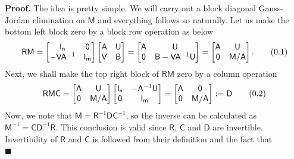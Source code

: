 \documentclass[10pt]{article}
\theoremstyle{definition}
\newenvironment{prf}{\noindent\textbf{Proof.}}{\hfill$\blacksquare$}
\newcommand\eqnum{\addtocounter{equation}{1}\tag{\arabic{section}.\arabic{equation}}}
\begin{document}
\begin{prf}
The idea is pretty simple. We will carry out a block diagonal Gauss-Jordan elimination on $\mathsf{M}$ and everything follows so naturally. Let us make the bottom left block zero by a block row operation as below
\begin{equation*}
\mathsf{R}\mathsf{M} =
\begin{bmatrix}
\mathsf{I_n} & \mathsf{0} \\
-\mathsf{V}\mathsf{A}^{-1} & \mathsf{I_m}
\end{bmatrix}
\begin{bmatrix}
\mathsf{A} & \mathsf{U} \\
\mathsf{V} & \mathsf{B}
\end{bmatrix} =
\begin{bmatrix}
\mathsf{A} & \mathsf{U} \\
\mathsf{0} & \mathsf{B}-\mathsf{V}\mathsf{A}^{-1}\mathsf{U}
\end{bmatrix} =
\begin{bmatrix}
\mathsf{A} & \mathsf{U} \\
\mathsf{0} & \mathsf{M}/\mathsf{A}
\end{bmatrix}.
\eqnum
\label{eq:inv:RM}
\end{equation*}
Next, we shall make the top right block of $\mathsf{R}\mathsf{M}$ zero by a column operation
\begin{equation*}
\mathsf{R}\mathsf{M}\mathsf{C} =
\begin{bmatrix}
\mathsf{A} & \mathsf{U} \\
\mathsf{0} & \mathsf{M}/\mathsf{A}
\end{bmatrix}
\begin{bmatrix}
\mathsf{I_n} & -\mathsf{A}^{-1}\mathsf{U} \\
\mathsf{0} & \mathsf{I_m}
\end{bmatrix} = 
\begin{bmatrix}
\mathsf{A} & \mathsf{0} \\
\mathsf{0} & \mathsf{M}/\mathsf{A}
\end{bmatrix} := \mathsf{D}
\eqnum
\label{eq:D:RMC}
\end{equation*}
Now, we note that $\mathsf{M} = \mathsf{R}^{-1}\mathsf{D}\mathsf{C}^{-1}$, so the inverse can be calculated as $\mathsf{M}^{-1} = \mathsf{C}\mathsf{D}^{-1}\mathsf{R}$. This conclusion is valid since $\mathsf{R}$, $\mathsf{C}$ and $\mathsf{D}$ are invertible. Invertibility of $\mathsf{R}$ and $\mathsf{C}$ is followed from their definition and the fact that 
\begin{equation}

\end{equation}
\end{prf}
\end{document}
